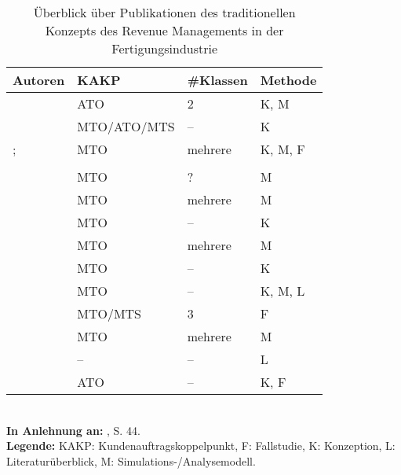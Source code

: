 \begin{table}[h!]
  \begin{center}
    \caption{Überblick über Publikationen des traditionellen Konzepts des Revenue Managements in der Fertigungsindustrie}  \label{Überblick}
    \vspace*{3mm}
    \begin{tabular}{llll}   %
     Autoren & KAKP  & \#Klassen & Methode  \\ \hline
     \cite{deBHarris1995299} &      ATO          &  2  &  K, M \\
      \cite{Kalyan:2002aa}      &      MTO/ATO/MTS          &  --  &  K \\
                \cite{rehkopf:2005aa};   &      MTO          &  mehrere &  K, M, F \\
                               \cite{Spengler:2007aa}   &                &  &   \\
            \cite{petrick2012using}      &      MTO          &  ?  &  M \\
              \cite{DECI:DECI074}  &      MTO          &  mehrere  &  M \\
               &      MTO          &  --  &  K \\
                   &      MTO          &  mehrere  &  M \\
               &      MTO          &  --  &  K \\
               &      MTO          &  --  &  K, M, L \\
                &      MTO/MTS          &  3  &  F \\
                   &      MTO          &  mehrere  &  M \\
                  &      --          &  --  &  L \\
                &        ATO    &  --  & K, F  \\    \hline
    \end{tabular} \\[3mm]
    {\footnotesize \textbf{In Anlehnung an:} \cite{quante2009management}, S. 44.}\\
        {\footnotesize \textbf{Legende:} KAKP: Kundenauftragskoppelpunkt, F: Fallstudie, K: Konzeption, L: Literaturüberblick, M: Simulations-/Analysemodell. }   %
  \end{center}
\end{table}

